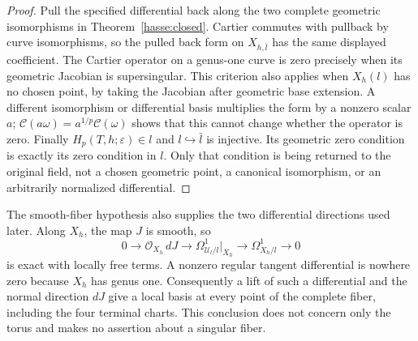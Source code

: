 \begin{proof}
Pull the specified differential back along the two complete
geometric isomorphisms in Theorem~\ref{hasse:closed}.
Cartier commutes with pullback by curve isomorphisms, so the pulled
back form on $X_{h,\bar l}$ has the same displayed coefficient.
The Cartier operator on a genus-one curve is zero precisely when
its geometric Jacobian is supersingular.  This criterion also
applies when $X_h(l)$ has no chosen point, by taking the Jacobian
after geometric base extension.  A different isomorphism or
differential basis multiplies the form by a nonzero scalar $a$;
$\mathcal C(a\omega)=a^{1/p}\mathcal C(\omega)$ shows that this
cannot change whether the operator is zero.  Finally
$H_p(T,h;\varepsilon)\in l$ and $l\hookrightarrow\bar l$ is
injective.  Its geometric zero condition is exactly its zero
condition in $l$.  Only that condition is being returned to the
original field, not a chosen geometric point, a canonical
isomorphism, or an arbitrarily normalized differential.
\end{proof}

\begin{remark}\label{hasse:two-directions}
The smooth-fiber hypothesis also supplies the two differential
directions used later.  Along $X_h$, the map $J$ is smooth, so
\[
0\longrightarrow\mathcal O_{X_h}\,dJ
\longrightarrow\Omega^1_{\mathcal U_l/l}|_{X_h}
\longrightarrow\Omega^1_{X_h/l}\longrightarrow0
\]
is exact with locally free terms.  A nonzero regular tangent
differential is nowhere zero because $X_h$ has genus one.
Consequently a lift of such a differential and the normal
direction $dJ$ give a local basis at every point of the complete
fiber, including the four terminal charts.  This conclusion
does not concern only the torus and makes no assertion about a
singular fiber.
\end{remark}
